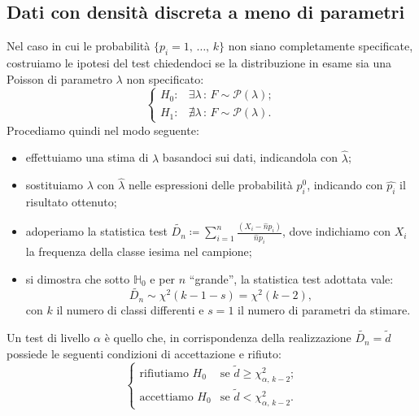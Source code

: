         \subsection{Dati con densità discreta a meno di parametri}
            \begin{defn}
                Nel caso in cui le probabilità $\{p_i = 1,\, \ldots,\, k\}$ non siano completamente specificate, 
                costruiamo le ipotesi del test chiedendoci se la distribuzione in esame sia una Poisson di parametro 
                $\lambda$ non specificato: \[
                    \begin{cases}
                        H_0 : & \exists \lambda \,:\, F \sim \mathcal{P}(\lambda); \\
                        H_1 : & \nexists \lambda \,:\, F \sim \mathcal{P}(\lambda).
                    \end{cases}
                \]
                Procediamo quindi nel modo seguente:
                \begin{itemize}
                    \item effettuiamo una stima di $\lambda$ basandoci sui dati, indicandola con $\hat{\lambda}$;
                    \item sostituiamo $\lambda$ con $\hat{\lambda}$ nelle espressioni delle probabilità $p_i^0$, 
                        indicando con $\hat{p_i}$ il risultato ottenuto;
                    \item adoperiamo la statistica test $\tilde{D_n} \coloneqq \sum_{i=1}^{n} 
                        \frac{(X_i-\hat{n}p_i)}{\hat{n}p_i}$, dove indichiamo con $X_i$ la frequenza della classe 
                        i\nbdash esima nel campione;
                    \item si dimostra che sotto $\mathbb{H}_0$ e per $n$ ``grande'', la statistica test adottata vale: \[
                            \tilde{D_n} \sim \chi^2(k - 1 - s) = \chi^2(k-2)
                        ,\] con $k$ il numero di classi differenti e $s=1$ il numero di parametri da stimare.
                \end{itemize}
                Un test di livello $\alpha$ è quello che, in corrispondenza della realizzazione $\tilde{D_n} = \tilde{d}$ 
                possiede le seguenti condizioni di accettazione e rifiuto: \[
                \begin{cases}
                    \text{rifiutiamo } H_0 & 
                    \text{se $\tilde{d} \geq \chi^2_{\alpha,\,k-2}$;} \\
                    \text{accettiamo } H_0 & 
                    \text{se $\tilde{d} < \chi^2_{\alpha,\,k-2}$.}
                \end{cases}
                \]
                \end{defn}
